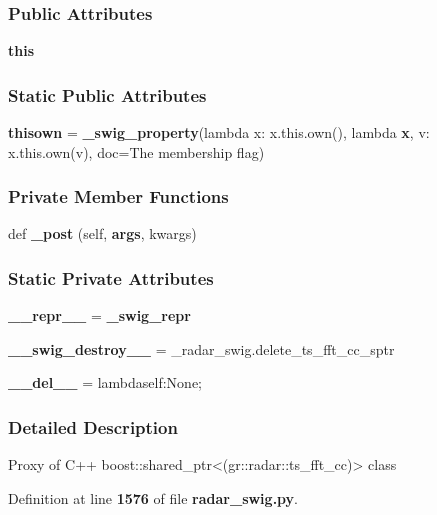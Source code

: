 \subsubsection*{Public Attributes}
\begin{DoxyCompactItemize}
\item 
{\bf this}
\end{DoxyCompactItemize}
\subsubsection*{Static Public Attributes}
\begin{DoxyCompactItemize}
\item 
{\bf thisown} = {\bf \+\_\+swig\+\_\+property}(lambda x\+: x.\+this.\+own(), lambda {\bf x}, v\+: x.\+this.\+own(v), doc=\textquotesingle{}The membership flag\textquotesingle{})
\end{DoxyCompactItemize}
\subsubsection*{Private Member Functions}
\begin{DoxyCompactItemize}
\item 
def {\bf \+\_\+post} (self, {\bf args}, kwargs)
\end{DoxyCompactItemize}
\subsubsection*{Static Private Attributes}
\begin{DoxyCompactItemize}
\item 
{\bf \+\_\+\+\_\+repr\+\_\+\+\_\+} = {\bf \+\_\+swig\+\_\+repr}
\item 
{\bf \+\_\+\+\_\+swig\+\_\+destroy\+\_\+\+\_\+} = \+\_\+radar\+\_\+swig.\+delete\+\_\+ts\+\_\+fft\+\_\+cc\+\_\+sptr
\item 
{\bf \+\_\+\+\_\+del\+\_\+\+\_\+} = lambdaself\+:\+None;
\end{DoxyCompactItemize}


\subsubsection{Detailed Description}
\begin{DoxyVerb}Proxy of C++ boost::shared_ptr<(gr::radar::ts_fft_cc)> class\end{DoxyVerb}
 

Definition at line {\bf 1576} of file {\bf radar\+\_\+swig.\+py}.



